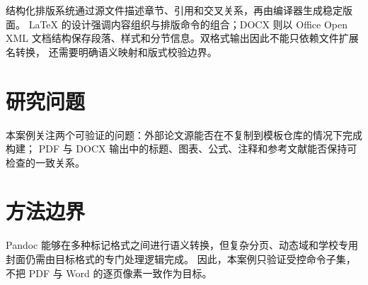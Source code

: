 \yibinopeningchapter

结构化排版系统通过源文件描述章节、引用和交叉关系，再由编译器生成稳定版面。
LaTeX 的设计强调内容组织与排版命令的组合；DOCX 则以 Office Open XML
文档结构保存段落、样式和分节信息。双格式输出因此不能只依赖文件扩展名转换，
还需要明确语义映射和版式校验边界。

\section{研究问题}

本案例关注两个可验证的问题：外部论文源能否在不复制到模板仓库的情况下完成构建；
PDF 与 DOCX 输出中的标题、图表、公式、注释和参考文献能否保持可检查的一致关系。

\section{方法边界}

Pandoc 能够在多种标记格式之间进行语义转换，但复杂分页、动态域和学校专用封面仍需由目标格式的专门处理逻辑完成。
因此，本案例只验证受控命令子集，不把 PDF 与 Word 的逐页像素一致作为目标。
